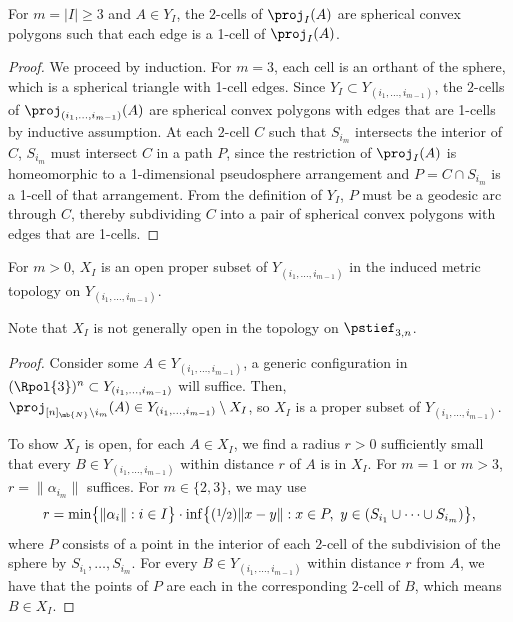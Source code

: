 \begin{claim}\label{claim-sphericonvex}
For $m = |I| \geq 3$ and $A \in Y_I$, the $2$-cells of $\proj_I({A})$ are spherical convex polygons such that each edge is a 1-cell of $\proj_I({A})$.
\end{claim}

\begin{proof}
We proceed by induction. For $m=3$, each cell is an orthant of the sphere, which is a spherical triangle with 1-cell edges. Since $Y_I \subset Y_{(i_1,\dots,i_{m-1})}$, the $2$-cells of $\proj_{(i_1,\dots,i_{m-1})}(A)$ are spherical convex polygons with edges that are 1-cells by inductive assumption. At each $2$-cell $C$ such that $S_{i_m}$ intersects the interior of $C$, $S_{i_m}$ must intersect $C$ in a path $P$, since the restriction of $\proj_I({A})$ is homeomorphic to a 1-dimensional pseudosphere arrangement and $P = C \cap S_{i_m}$ is a 1-cell of that arrangement.
From the definition of $Y_I$, $P$ must be a geodesic arc through $C$, thereby subdividing $C$ into a pair of spherical convex polygons with edges that are 1-cells.
\end{proof}

\begin{claim}\label{claim-open-X}
For $m > 0$, $X_I$ is an open proper subset of $Y_{(i_1,\dots,i_{m-1})}$ in the induced metric topology on $Y_{(i_1,\dots,i_{m-1})}$.
\end{claim}

Note that $X_I$ is not generally open in the topology on $\pstief_{3,n}$.

\begin{proof}
Consider some $A \in Y_{(i_1,\dots,i_{m-1})}$, a generic configuration in $(\Rpol{3})^n \subset Y_{(i_1,\dots,i_{m-1})}$ will suffice. Then, $\proj_{[n]_\mb{N}\setminus i_m}(A) \in Y_{(i_1,\dots,i_{m-1})} \setminus X_I$, so $X_I$ is a proper subset of $Y_{(i_1,\dots,i_{m-1})}$.

To show $X_I$ is open, for each $A \in X_I$, we find a radius $r>0$ sufficiently small that every $B \in Y_{(i_1,\dots,i_{m-1})}$ within distance $r$ of $A$ is in $X_I$.
For $m =1$ or $m>3$, $r = \|\alpha_{i_m}\|$ suffices.
For $m \in \{2,3\}$, we may use
\[ r = \min \bigl\{\|\alpha_i\|:i\in I \bigr\} \cdot \inf\bigl\{ (\nicefrac{1}{2}) \|x -y\|:x \in P,\ y \in (S_{i_1} \cup \dots \cup S_{i_m}) \bigr\}, \]
where $P$ consists of a point in the interior of each $2$-cell of the subdivision of the sphere by $S_{i_1},\dots,S_{i_m}$.
For every $B \in Y_{(i_1,\dots,i_{m-1})}$ within distance $r$ from $A$, we have that the points of $P$ are each in the corresponding $2$-cell of $B$, which means $B \in X_I$.
\end{proof}


